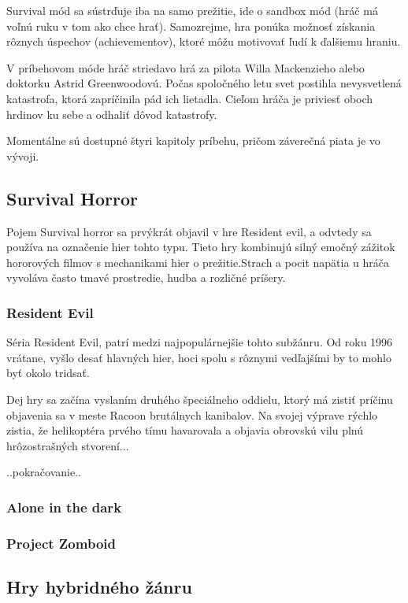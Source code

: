 \documentclass[10pt,oneoside,slovak,a4paper]{article}
\begin{document}
Survival mód sa  sústrďuje iba na samo prežitie, ide o sandbox  mód (hráč má voľnú ruku v tom ako chce hrať).  Samozrejme, hra ponúka  možnosť získania rôznych úspechov (achievementov), ktoré môžu motivovať ľudí k ďalšiemu hraniu. 

V príbehovom móde hráč striedavo hrá za pilota Willa Mackenzieho  alebo doktorku  Astrid Greenwoodovú. Počas spoločného letu svet postihla nevysvetlená katastrofa, ktorá zapríčinila pád ich lietadla. Cieľom hráča je priviesť oboch hrdinov ku sebe a odhaliť dôvod katastrofy.

Momentálne sú dostupné štyri kapitoly príbehu, pričom záverečná piata je vo vývoji.


\subsection{Survival Horror}
Pojem Survival horror sa prvýkrát objavil v hre Resident evil, a odvtedy sa používa na označenie hier tohto typu. \cite{Kirkland} Tieto hry kombinujú silný emočný zážitok hororových filmov s mechanikami hier o prežitie.Strach a pocit napätia u hráča vyvoláva často  tmavé prostredie, hudba a rozličné príšery.

\subsubsection{Resident Evil}
Séria Resident Evil, patrí medzi najpopulárnejšie tohto subžánru. Od roku 1996 vrátane, vyšlo desať hlavných hier, hoci spolu s rôznymi vedľajšími by to mohlo byť okolo tridsať.  \cite{ResEv}

Dej hry sa začína vyslaním druhého špeciálneho oddielu, ktorý má zistiť príčinu objavenia sa v meste Racoon brutálnych kanibalov. Na svojej výprave rýchlo zistia, že helikoptéra prvého tímu havarovala a objavia obrovskú vilu plnú hrôzostrašných stvorení...\cite{WindowsCentral}


..pokračovanie..


\subsubsection{Alone in the dark}


\subsubsection{Project Zomboid}


\subsection{Hry hybridného žánru}
\end{document}
